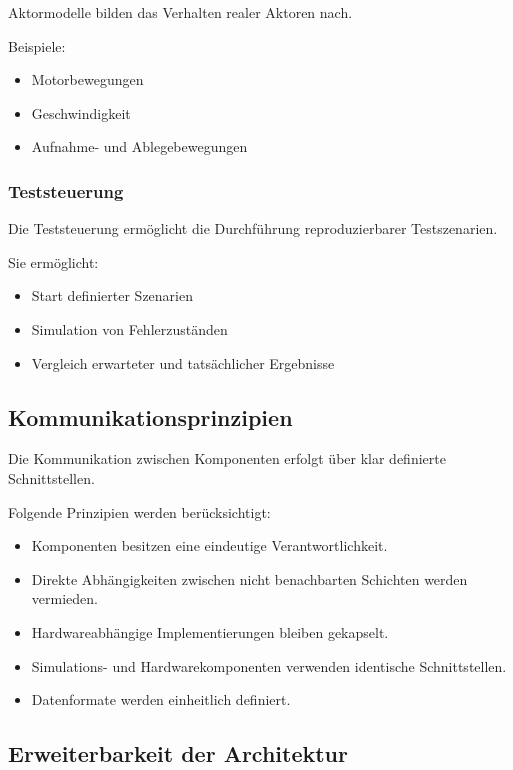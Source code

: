 \documentclass[
  a4paper,
  12pt,
  DIV=12,        %
  parskip=half,  %
  headings=small %
]{scrartcl}
\theoremstyle{definition}
\providecommand{\tightlist}{%
  \setlength{\itemsep}{0pt}\setlength{\parskip}{0pt}}
\theoremstyle{definition}
\begin{document}
Aktormodelle bilden das Verhalten realer Aktoren nach.

Beispiele:

\begin{itemize}
\tightlist
\item
  Motorbewegungen
\item
  Geschwindigkeit
\item
  Aufnahme- und Ablegebewegungen
\end{itemize}

\subsubsection{Teststeuerung}\label{teststeuerung}

Die Teststeuerung ermöglicht die Durchführung reproduzierbarer
Testszenarien.

Sie ermöglicht:

\begin{itemize}
\tightlist
\item
  Start definierter Szenarien
\item
  Simulation von Fehlerzuständen
\item
  Vergleich erwarteter und tatsächlicher Ergebnisse
\end{itemize}

\subsection{Kommunikationsprinzipien}\label{kommunikationsprinzipien}

Die Kommunikation zwischen Komponenten erfolgt über klar definierte
Schnittstellen.

Folgende Prinzipien werden berücksichtigt:

\begin{itemize}
\tightlist
\item
  Komponenten besitzen eine eindeutige Verantwortlichkeit.
\item
  Direkte Abhängigkeiten zwischen nicht benachbarten Schichten werden
  vermieden.
\item
  Hardwareabhängige Implementierungen bleiben gekapselt.
\item
  Simulations- und Hardwarekomponenten verwenden identische
  Schnittstellen.
\item
  Datenformate werden einheitlich definiert.
\end{itemize}

\subsection{Erweiterbarkeit der
Architektur}\label{erweiterbarkeit-der-architektur}
\end{document}
